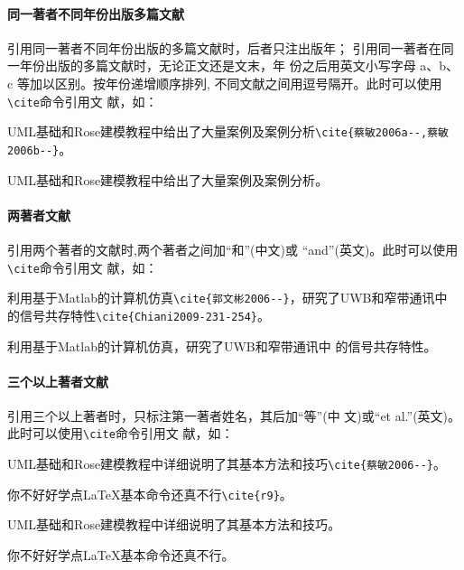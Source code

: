 \documentclass{ctexart}
\newcommand\cs[1]{\texttt{\textbackslash#1}}
\begin{document}
\paragraph{同一著者不同年份出版多篇文献}
引用同一著者不同年份出版的多篇文献时，后者只注出版年；
引用同一著者在同一年份出版的多篇文献时，无论正文还是文末，年
份之后用英文小写字母 a、b、c 等加以区别。按年份递增顺序排列,
不同文献之间用逗号隔开。此时可以使用\cs{cite}命令引用文
献，如：

\begin{center}
  \begin{minipage}{0.45\textwidth}
    \small
    UML基础和Rose建模教程中给出了大量案例及案例分析\verb|\cite{蔡敏2006a--,蔡敏2006b--}|。%
  \end{minipage}
  \begin{boxedminipage}{0.45\textwidth}
    \small
    UML基础和Rose建模教程中给出了大量案例及案例分析\cite{蔡敏2006a--,蔡敏2006b--}。%
  \end{boxedminipage}
\end{center}


\paragraph{两著者文献}

引用两个著者的文献时,两个著者之间加\enquote{和}(中文)或
\enquote{and}(英文)。此时可以使用\cs{cite}命令引用文
献，如：

\begin{center}
  \begin{minipage}{0.45\textwidth}
    \small
    利用基于Matlab的计算机仿真\verb|\cite{郭文彬2006--}|，研究了UWB和窄带通讯中
      的信号共存特性\verb|\cite{Chiani2009-231-254}|。%
  \end{minipage}
  \begin{boxedminipage}{0.45\textwidth}
    \small
    利用基于Matlab的计算机仿真\cite{郭文彬2006--}，研究了UWB和窄带通讯中
      的信号共存特性\cite{Chiani2009-231-254}。%
  \end{boxedminipage}
\end{center}


\paragraph{三个以上著者文献}

引用三个以上著者时，只标注第一著者姓名，其后加\enquote{等}(中
文)或\enquote{et al.}(英文)。此时可以使用\cs{cite}命令引用文
献，如：

\begin{center}
  \begin{minipage}{0.45\textwidth}
    \small
    UML基础和Rose建模教程中详细说明了其基本方法和技巧\verb|\cite{蔡敏2006--}|。

    你不好好学点\LaTeX{}基本命令还真不行\verb|\cite{r9}|。%
  \end{minipage}
  \begin{boxedminipage}{0.45\textwidth}
    \small
    UML基础和Rose建模教程中详细说明了其基本方法和技巧\cite{蔡敏2006--}。

    你不好好学点\LaTeX{}基本命令还真不行\cite{r9}。%
  \end{boxedminipage}
\end{center}
\end{document}
